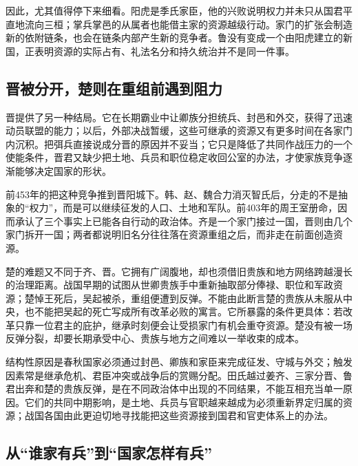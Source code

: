 因此，尤其值得停下来细看。阳虎是季氏家臣，他的兴败说明权力并未只从国君平直地流向三桓；掌兵掌邑的从属者也能借主家的资源越级行动。家门的扩张会制造新的依附链条，也会在链条内部产生新的竞争者。鲁没有变成一个由阳虎建立的新国，正表明资源的实际占有、礼法名分和持久统治并不是同一件事。

\subsection{晋被分开，楚则在重组前遇到阻力}

晋提供了另一种结局。它在长期霸业中让卿族分担统兵、封邑和外交，获得了迅速动员联盟的能力；以后，外部决战暂缓，这些可继承的资源又有更多时间在各家门内沉积。把弭兵直接说成分晋的原因并不妥当；它只是降低了共同作战压力的一个使能条件，晋君又缺少把土地、兵员和职位稳定收回公室的办法，才使家族竞争逐渐能够决定国家的形状。

前453年的把这种竞争推到晋阳城下。韩、赵、魏合力消灭智氏后，分走的不是抽象的“权力”，而是可以继续征发的人口、土地和军队。前403年的周王室册命，因而承认了三个事实上已能各自行动的政治体。齐是一个家门接过一国，晋则由几个家门拆开一国；两者都说明旧名分往往落在资源重组之后，而非走在前面创造资源。

楚的难题又不同于齐、晋。它拥有广阔腹地，却也须借旧贵族和地方网络跨越漫长的治理距离。战国早期的试图从世卿贵族手中重新抽取部分俸禄、职位和军政资源；楚悼王死后，吴起被杀，重组便遭到反弹。不能由此断言楚的贵族从未服从中央，也不能把吴起的死亡写成所有改革必败的寓言。它所暴露的条件更具体：若改革只靠一位君主的庇护，继承时刻便会让受损家门有机会重夺资源。楚没有被一场反弹分裂，却要长期承受中心、贵族与地方之间难以一举收束的成本。

\begin{causalchain}[从家门积累到国家变形]
结构性原因是春秋国家必须通过封邑、卿族和家臣来完成征发、守城与外交；触发因素常是继承危机、君臣冲突或战争后的赏赐分配。田氏越过姜齐、三家分晋、鲁君出奔和楚的贵族反弹，是在不同政治体中出现的不同结果，不能互相充当单一原因。它们的共同中期影响，是土地、兵员与官职越来越成为必须重新界定归属的资源；战国各国由此更迫切地寻找能把这些资源接到国君和官吏体系上的办法。
\end{causalchain}

\subsection{从“谁家有兵”到“国家怎样有兵”}

